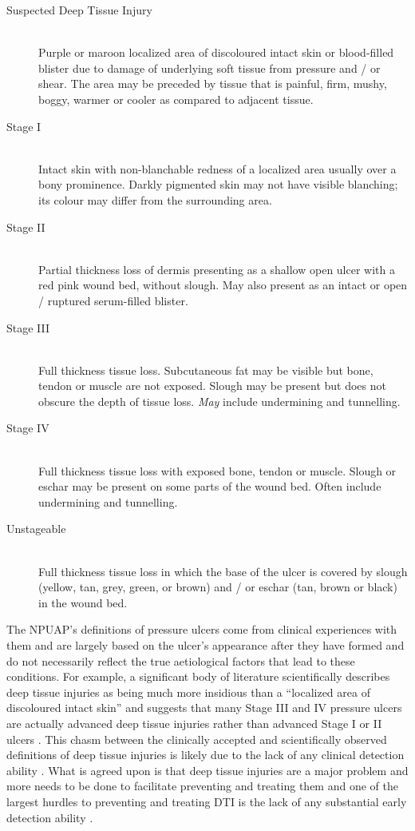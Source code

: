 		\begin{description}
			\item[Suspected Deep Tissue Injury] \hfill \\
				Purple or maroon localized area of discoloured intact skin or blood-filled blister due to damage of underlying soft tissue from pressure and / or shear. The area may be preceded by tissue that is painful, firm, mushy, boggy, warmer or cooler as compared to adjacent tissue.
			\item[Stage I] \hfill \\
				Intact skin with non-blanchable redness of a localized area usually over a bony prominence. Darkly pigmented skin may not have visible blanching; its colour may differ from the surrounding area.
			\item[Stage II] \hfill \\
				Partial thickness loss of dermis presenting as a shallow open ulcer with a red pink wound bed, without slough. May also present as an intact or open / ruptured serum-filled blister.
			\item[Stage III] \hfill \\
				Full thickness tissue loss. Subcutaneous fat may be visible but bone, tendon or muscle are not exposed. Slough may be present but does not obscure the depth of tissue loss. \emph{May} include undermining and tunnelling.
			\item[Stage IV] \hfill \\
				Full thickness tissue loss with exposed bone, tendon or muscle. Slough or eschar may be present on some parts of the wound bed. Often include undermining and tunnelling.
			\item[Unstageable] \hfill \\
				Full thickness tissue loss in which the base of the ulcer is covered by slough (yellow, tan, grey, green, or brown) and / or eschar (tan, brown or black) in the wound bed.
		\end{description}

		The NPUAP's definitions of pressure ulcers come from clinical experiences with them and are largely based on the ulcer's appearance after they have formed and do not necessarily reflect the true aetiological factors that lead to these conditions. For example, a significant body of literature scientifically describes deep tissue injuries as being much more insidious than a ``localized area of discoloured intact skin'' and suggests that many Stage III and IV pressure ulcers are actually advanced deep tissue injuries rather than advanced Stage I or II ulcers \cite{gefen09}. This chasm between the clinically accepted and scientifically observed definitions of deep tissue injuries is likely due to the lack of any clinical detection ability \cite{campbell10}. What is agreed upon is that deep tissue injuries are a major problem and more needs to be done to facilitate preventing and treating them \cite{black11,maklebust05} and one of the largest hurdles to preventing and treating DTI is the lack of any substantial early detection ability \cite{gunningberg08,milne09}.

